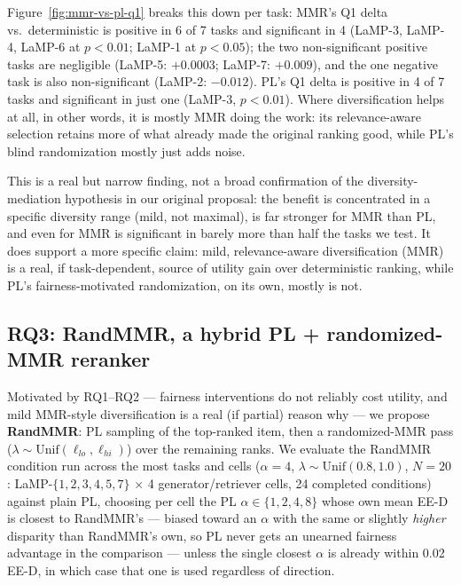 \documentclass[10pt,twocolumn]{article}
\begin{document}
Figure~\ref{fig:mmr-vs-pl-q1} breaks this down per task: MMR's Q1 delta vs.\
deterministic is positive in 6 of 7 tasks and significant in 4 (LaMP-3, LaMP-4,
LaMP-6 at $p{<}0.01$; LaMP-1 at $p{<}0.05$); the two non-significant positive tasks
are negligible (LaMP-5: $+0.0003$; LaMP-7: $+0.009$), and the one negative task is
also non-significant (LaMP-2: $-0.012$). PL's Q1 delta is positive in 4 of 7 tasks
and significant in just one (LaMP-3, $p{<}0.01$).
Where diversification helps at all, in other words, it is mostly MMR doing the work:
its relevance-aware selection retains more of what already made the original ranking
good, while PL's blind randomization mostly just adds noise.

This is a real but narrow finding, not a broad confirmation of the
diversity-mediation hypothesis in our original proposal: the benefit is concentrated
in a specific diversity range (mild, not maximal), is far stronger for MMR than PL,
and even for MMR is significant in barely more than half the tasks we test. It does
support a more specific claim: mild, relevance-aware diversification (MMR) is a real,
if task-dependent, source of utility gain over deterministic ranking, while PL's
fairness-motivated randomization, on its own, mostly is not.

\subsection{RQ3: RandMMR, a hybrid PL + randomized-MMR reranker}
\label{sec:rq3}

Motivated by RQ1--RQ2 --- fairness interventions do not reliably cost utility, and
mild MMR-style diversification is a real (if partial) reason why --- we propose
\textbf{RandMMR}: PL sampling of the top-ranked item, then a randomized-MMR pass
($\lambda \sim \mathrm{Unif}(\ell_{lo},\ell_{hi})$) over the remaining ranks. We
evaluate the RandMMR condition run across the most tasks and cells ($\alpha{=}4$,
$\lambda\sim\mathrm{Unif}(0.8,1.0)$, $N{=}20$: LaMP-$\{1,2,3,4,5,7\}$ $\times$ 4
generator/retriever cells, 24 completed conditions) against plain PL, choosing per
cell the PL $\alpha \in \{1,2,4,8\}$ whose own mean EE-D is closest to RandMMR's ---
biased toward an $\alpha$ with the same or slightly \emph{higher} disparity than
RandMMR's own, so PL never gets an unearned fairness advantage in the comparison ---
unless the single closest $\alpha$ is already within 0.02 EE-D, in which case that one
is used regardless of direction.
\end{document}
